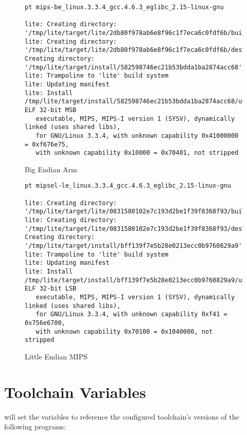 \begin{landscape}
\begin{figure}
\hrulefill
\begin{verbatim}
pt mips-be_linux.3.3.4_gcc.4.6.3_eglibc_2.15-linux-gnu

lite: Creating directory: '/tmp/lite/target/lite/2db80f978ab6e8f96c1f7eca6c0fdf6b/build'
lite: Creating directory: '/tmp/lite/target/lite/2db80f978ab6e8f96c1f7eca6c0fdf6b/destdir'
Creating directory: '/tmp/lite/target/install/582598746ec21b53bdda1ba2874acc68'
lite: Trampoline to 'lite' build system
lite: Updating manifest
lite: Install
/tmp/lite/target/install/582598746ec21b53bdda1ba2874acc68/usr/bin/lite: ELF 32-bit MSB
   executable, MIPS, MIPS-I version 1 (SYSV), dynamically linked (uses shared libs),
   for GNU/Linux 3.3.4, with unknown capability 0x41000000 = 0xf676e75,
   with unknown capability 0x10000 = 0x70401, not stripped
\end{verbatim}
\caption{Big Endian Arm}\label{toolchain-usage:be-mips}
\hrulefill
\end{figure}

\begin{figure}
\hrulefill
\begin{verbatim}
pt mipsel-le_linux.3.3.4_gcc.4.6.3_eglibc_2.15-linux-gnu

lite: Creating directory: '/tmp/lite/target/lite/0831580102e7c193d2be1f39f8368f93/build'
lite: Creating directory: '/tmp/lite/target/lite/0831580102e7c193d2be1f39f8368f93/destdir'
Creating directory: '/tmp/lite/target/install/bff139f7e5b28e0213ecc0b9760829a9'
lite: Trampoline to 'lite' build system
lite: Updating manifest
lite: Install
/tmp/lite/target/install/bff139f7e5b28e0213ecc0b9760829a9/usr/bin/lite: ELF 32-bit LSB
   executable, MIPS, MIPS-I version 1 (SYSV), dynamically linked (uses shared libs),
   for GNU/Linux 3.3.4, with unknown capability 0xf41 = 0x756e6700,
   with unknown capability 0x70100 = 0x1040000, not stripped
\end{verbatim}
\caption{Little Endian MIPS}\label{toolchain-usage:le-mips}
\hrulefill
\end{figure}
\end{landscape}



\section{Toolchain Variables}\label{toolchain-usage:variables}

\lmsbw will set the \makefile variables to reference the configured
toolchain's versions of the following programs:

